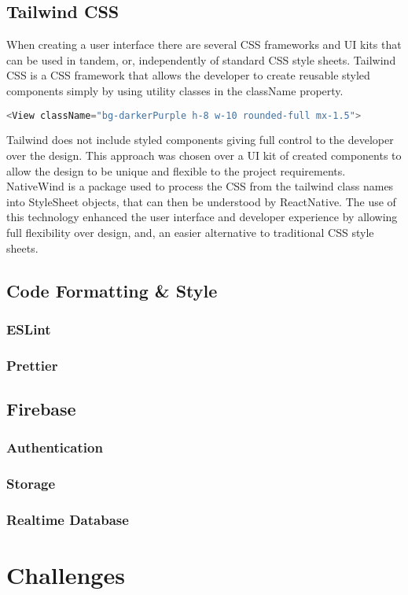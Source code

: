 \subsection{Tailwind CSS}
When creating a user interface there are several CSS frameworks and UI kits that can be used in tandem, or, independently of standard CSS style sheets. Tailwind CSS \cite{tailwind} is a CSS framework that allows the developer to create reusable styled components simply by using utility classes in the className property.\begin{lstlisting}[language=JavaScript, caption={Creates a dark purple, rounded view with height 8 units, width 10 units, and, a margin left and right of 1.5 units}]
  <View className="bg-darkerPurple h-8 w-10 rounded-full mx-1.5">
\end{lstlisting}
Tailwind does not include styled components giving full control to the developer over the design. This approach was chosen over a UI kit of created components to allow the design to be unique and flexible to the project requirements. NativeWind \cite{nativewind} is a package used to process the CSS from the tailwind class names into StyleSheet objects, that can then be understood by ReactNative. The use of this technology enhanced the user interface and developer experience by allowing full flexibility over design, and, an easier alternative to traditional CSS style sheets.   
\subsection{Code Formatting \& Style} \label{CodeF&S}
\subsubsection{ESLint}
\subsubsection{Prettier}
\subsection{Firebase}
\subsubsection{Authentication}
\subsubsection{Storage}
\subsubsection{Realtime Database}
\section{Challenges}
